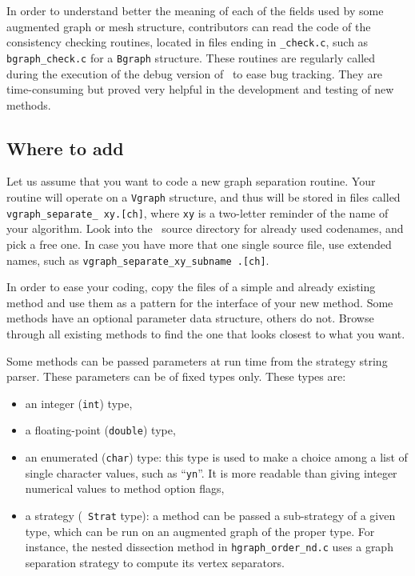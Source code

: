 In order to understand better the meaning of each of the fields
used by some augmented graph or mesh structure, contributors can read
the code of the consistency checking routines, located in files ending
in \texttt{\_check.c}\enspace, such as \texttt{bgraph\_check.c} for a
\texttt{Bgraph} structure. These routines are regularly called during the
execution of the debug version of \scotch\ to ease bug tracking. They
are time-consuming but proved very helpful in the development and
testing of new methods.

\subsection{Where to add}

Let us assume that you want to code a new graph separation
routine. Your routine will operate on a \texttt{Vgraph} structure, and
thus will be stored in files called \texttt{vgraph\_\lbt separate\_
xy\lbt .[ch]}, where \texttt{xy} is a two-letter reminder of the name
of your algorithm. Look into the \libscotch\ source directory for
already used codenames, and pick a free one.
In case you have more that one single source file, use extended names,
such as \texttt{vgraph\_\lbt separate\_\lbt xy\_\lbt subname\lbt
.[ch]}\enspace .

In order to ease your coding, copy the files of a simple and already
existing method and use them as a pattern for the interface of your
new method. Some methods have an optional parameter data structure,
others do not. Browse through all existing methods to find the one
that looks closest to what you want.

Some methods can be passed parameters at run time from the strategy
string parser. These parameters can be of fixed types only. These
types are:
\begin{itemize}
\item
an integer (\texttt{int}) type,
\item
a floating-point (\texttt{double}) type,
\item
an enumerated (\texttt{char}) type: this type is used to make a
choice among a list of single character values, such as
``\texttt{yn}''. It is more readable than giving integer numerical
values to method option flags,
\item
a strategy (\scotch\ \texttt{Strat} type): a method can be passed a
sub-strategy of a given type, which can be run on an augmented graph
of the proper type. For instance, the nested dissection method in
\texttt{hgraph\_\lbt order\_\lbt nd\lbt .c} uses a graph separation
strategy to compute its vertex separators.
\end{itemize}

